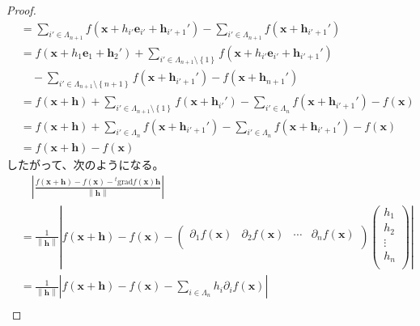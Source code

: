 \documentclass[dvipdfmx]{jsarticle}
\begin{document}
\begin{proof}
\begin{align*}
&= \sum_{i' \in \varLambda_{n + 1}} {f\left( \mathbf{x} + h_{i'}\mathbf{e}_{i'} + \mathbf{h}_{i' + 1}' \right)} - \sum_{i' \in \varLambda_{n + 1}} {f\left( \mathbf{x} + \mathbf{h}_{i' + 1}' \right)}\\
&= f\left( \mathbf{x} + h_{1}\mathbf{e}_{1} + \mathbf{h}_{2}' \right) + \sum_{i' \in \varLambda_{n + 1} \setminus \left\{ 1 \right\}} {f\left( \mathbf{x} + h_{i'}\mathbf{e}_{i'} + \mathbf{h}_{i' + 1}' \right)} \\
&\quad - \sum_{i' \in \varLambda_{n + 1} \setminus \left\{ n + 1 \right\}} {f\left( \mathbf{x} + \mathbf{h}_{i' + 1}' \right)} - f\left( \mathbf{x} + \mathbf{h}_{n + 1}' \right)\\
&= f\left( \mathbf{x} + \mathbf{h} \right) + \sum_{i' \in \varLambda_{n + 1} \setminus \left\{ 1 \right\}} {f\left( \mathbf{x} + \mathbf{h}_{i'}' \right)} - \sum_{i' \in \varLambda_{n}} {f\left( \mathbf{x} + \mathbf{h}_{i' + 1}' \right)} - f\left( \mathbf{x} \right)\\
&= f\left( \mathbf{x} + \mathbf{h} \right) + \sum_{i' \in \varLambda_{n}} {f\left( \mathbf{x} + \mathbf{h}_{i' + 1}' \right)} - \sum_{i' \in \varLambda_{n}} {f\left( \mathbf{x} + \mathbf{h}_{i' + 1}' \right)} - f\left( \mathbf{x} \right)\\
&= f\left( \mathbf{x} + \mathbf{h} \right) - f\left( \mathbf{x} \right)
\end{align*}
したがって、次のようになる。
\begin{align*}
&\quad \left| \frac{f\left( \mathbf{x} + \mathbf{h} \right) - f\left( \mathbf{x} \right) -{}^{t}\mathrm{grad}f\left( \mathbf{x} \right)\mathbf{h}}{\left\| \mathbf{h} \right\|} \right|\\
&= \frac{1}{\left\| \mathbf{h} \right\|}\left| f\left( \mathbf{x} + \mathbf{h} \right) - f\left( \mathbf{x} \right) - \begin{pmatrix}
\partial_{1}f\left( \mathbf{x} \right) & \partial_{2}f\left( \mathbf{x} \right) & \cdots & \partial_{n}f\left( \mathbf{x} \right) \\
\end{pmatrix}\begin{pmatrix}
h_{1} \\
h_{2} \\
 \vdots \\
h_{n} \\
\end{pmatrix} \right|\\
&= \frac{1}{\left\| \mathbf{h} \right\|}\left| f\left( \mathbf{x} + \mathbf{h} \right) - f\left( \mathbf{x} \right) - \sum_{i \in \varLambda_{n}} {h_{i}\partial_{i}f\left( \mathbf{x} \right)} \right|\\

\end{align*}
\end{proof}
\end{document}
